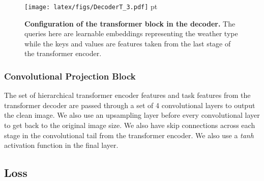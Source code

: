 \documentclass[10pt,twocolumn,letterpaper]{article}
\begin{document}
\begin{figure}[htp!]
	\centering
	\vspace{-1.3em}
	\texttt{[image: latex/figs/DecoderT\_3.pdf]}
	 pt
	\caption{\textbf{Configuration of the transformer block in the  decoder.} The queries here are learnable embeddings representing the weather type while the keys and values are features taken from the last stage of the transformer encoder.  }
	\label{decoder}
	\vspace{-1.6em}
\end{figure}



\subsubsection{Convolutional Projection Block}
The set of hierarchical transformer encoder features and task features from the transformer decoder are passed through a set of 4 convolutional layers to output the clean image. We also use an upsampling layer before every convolutional layer to get back to the original image size. We also have skip connections across each stage in the convolutional tail from the transformer encoder. We also use a \textit{tanh} activation function in the final layer. 


\subsection{Loss}
\end{document}
